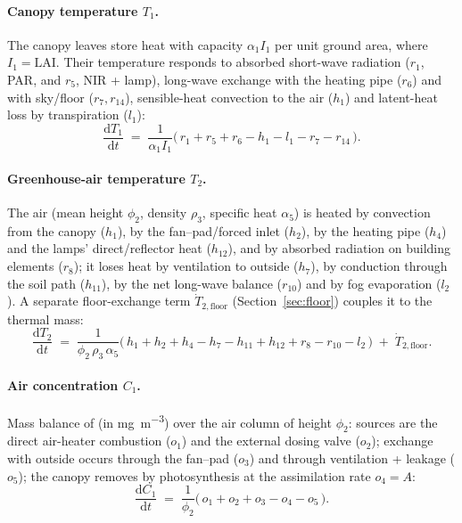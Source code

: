 \documentclass[11pt,a4paper]{article}
\newcommand{\dd}[2]{\frac{\mathrm{d}#1}{\mathrm{d}#2}}
\newcommand{\Tcan}{T_{1}}
\newcommand{\Tair}{T_{2}}
\newcommand{\Cair}{C_{1}}
\begin{document}
\paragraph{Canopy temperature $\Tcan$.} The canopy leaves store heat with capacity
$\alpha_1 I_1$ per unit ground area, where $I_1=\mathrm{LAI}$. Their temperature responds to
absorbed short-wave radiation ($r_1$, PAR, and $r_5$, NIR + lamp), long-wave exchange with the
heating pipe ($r_6$) and with sky/floor ($r_7,r_{14}$), sensible-heat convection to the air
($h_1$) and latent-heat loss by transpiration ($l_1$):
\begin{equation}
  \dd{\Tcan}{t} \;=\; \frac{1}{\alpha_1 I_1}\Big(\,r_1 + r_5 + r_6 - h_1 - l_1 - r_7 - r_{14}\,\Big).
  \label{eq:dT1}
\end{equation}

\paragraph{Greenhouse-air temperature $\Tair$.} The air (mean height $\phi_2$, density $\rho_3$,
specific heat $\alpha_5$) is heated by convection from the canopy ($h_1$), by the fan--pad/forced
inlet ($h_2$), by the heating pipe ($h_4$) and the lamps' direct/reflector heat ($h_{12}$), and by
absorbed radiation on building elements ($r_8$); it loses heat by ventilation to outside ($h_7$),
by conduction through the soil path ($h_{11}$), by the net long-wave balance ($r_{10}$) and by fog
evaporation ($l_2$). A separate floor-exchange term $\dot{T}_{2,\text{floor}}$
(Section~\ref{sec:floor}) couples it to the thermal mass:
\begin{equation}
  \dd{\Tair}{t} \;=\; \frac{1}{\phi_2\,\rho_3\,\alpha_5}
     \Big(\,h_1 + h_2 + h_4 - h_7 - h_{11} + h_{12} + r_8 - r_{10} - l_2\,\Big)
     \;+\; \dot{T}_{2,\text{floor}}.
  \label{eq:dT2}
\end{equation}

\paragraph{Air  concentration $\Cair$.} Mass balance of  (in \si{mg.m^{-3}}) over
the air column of height $\phi_2$: sources are the direct air-heater combustion ($o_1$) and the
external  dosing valve ($o_2$); exchange with outside occurs through the fan--pad ($o_3$)
and through ventilation + leakage ($o_5$); the canopy removes  by photosynthesis at the
assimilation rate $o_4=A$:
\begin{equation}
  \dd{\Cair}{t} \;=\; \frac{1}{\phi_2}\Big(\,o_1 + o_2 + o_3 - o_4 - o_5\,\Big).
  \label{eq:dC1}
\end{equation}
\end{document}
